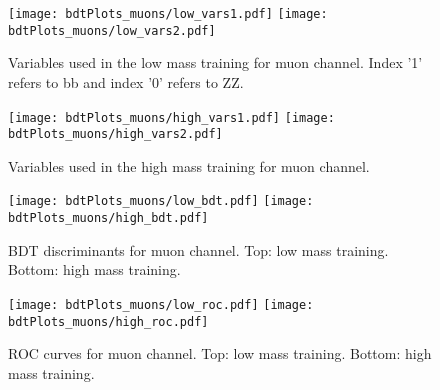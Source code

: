 


\begin{figure}[tbp]
  \begin{center}
   \texttt{[image: bdtPlots\_muons/low\_vars1.pdf]}
   \texttt{[image: bdtPlots\_muons/low\_vars2.pdf]}
    \caption{ Variables used in the low mass training for muon channel. Index '1' refers to bb and index '0' refers to ZZ.}
    \label{fig:muon_lowVars}
  \end{center}
\end{figure}



\begin{figure}[tbp]
  \begin{center}
   \texttt{[image: bdtPlots\_muons/high\_vars1.pdf]}
   \texttt{[image: bdtPlots\_muons/high\_vars2.pdf]}
    \caption{ Variables used in the high mass training for muon channel.}
    \label{fig:muon_highVars}
  \end{center}
\end{figure}


\begin{figure}[tbp]
  \begin{center}
   \texttt{[image: bdtPlots\_muons/low\_bdt.pdf]}
   \texttt{[image: bdtPlots\_muons/high\_bdt.pdf]}
    \caption{ BDT discriminants for muon channel. Top: low mass training. Bottom: high mass training. }
    \label{fig:muon_BDTs}
  \end{center}
\end{figure}

\begin{figure}[tbp]
  \begin{center}
   \texttt{[image: bdtPlots\_muons/low\_roc.pdf]}
   \texttt{[image: bdtPlots\_muons/high\_roc.pdf]}
    \caption{ ROC curves for muon channel. Top: low mass training. Bottom: high mass training. }
    \label{fig:muon_ROCs}
  \end{center}
\end{figure}

